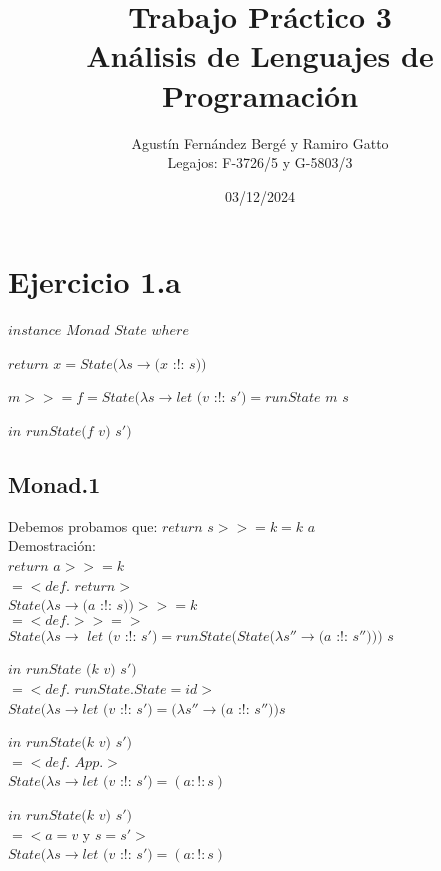 \documentclass[12pt, titlepage]{article}
\title{Trabajo Práctico 3\\ 
Análisis de Lenguajes de Programación}
\author{Agustín Fernández Bergé y Ramiro Gatto\\ Legajos: F-3726/5 y G-5803/3}
\date{03/12/2024}
\begin{document}
\maketitle

\section*{Ejercicio 1.a}

\noindent $instance$ $Monad$ $State$ $where$

\hspace{15pt}$return$ $x = State (\lambda s \rightarrow (x$ :!: $s))$

\hspace{15pt}$m >>= f = State (\lambda s \rightarrow let$ $(v$ :!: $s') = runState$ $m$ $s$

\hspace{145pt}$in$ $runState (f$ $v)$ $s')$


\subsection*{Monad.1}
Debemos probamos que: $return$ $s >>= k = k$ $a$\\
Demostración:\\
$return$ $a >>= k$\\
$= <def.$ $return >$\\
$State (\lambda s \rightarrow  (a$ :!: $s)) >>= k$ \\
$= < def. >>= >$\\
$State (\lambda s \rightarrow$ 
$let$ $(v$ :!: $s') = runState (State (\lambda s'' \rightarrow (a $ :!: $ s'')))$ $s$

\hspace{45pt} $in$ $runState$ $(k$ $v)$ $s')$\\
$=< def.$ $runState.State = id >$ \\
$State (\lambda s \rightarrow let$ $(v$ :!: $s') = (\lambda s'' \rightarrow  (a$ :!: $s'')) s$

\hspace{45pt} $in$ $runState (k$ $v)$ $s')$\\
$= < def.$ $App. >$\\
$State (\lambda s \rightarrow let$ $(v$ :!: $s') = (a :!: s)$

\hspace{45pt} $in$ $runState (k$ $v)$ $s')$\\
$= <a=v$ y $s=s'>$\\
$State (\lambda s \rightarrow let$ $(v$ :!: $s') = (a :!: s)$
\end{document}
